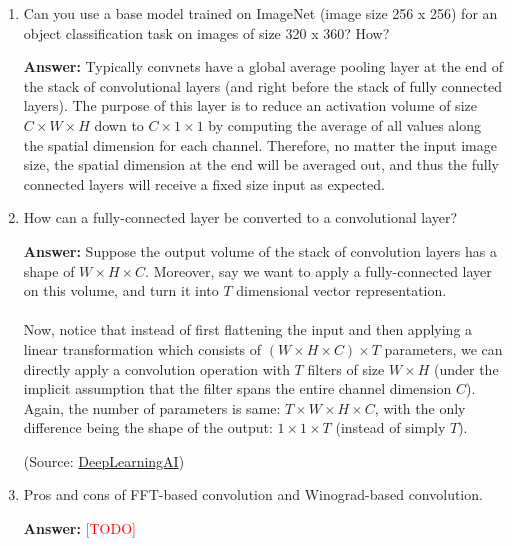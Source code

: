 \documentclass{article}
\newenvironment{QandA}{\begin{enumerate}[label=\arabic*.]}{\end{enumerate}}
\newenvironment{answer}{\par\normalfont \textbf{Answer:}}{}
\newcommand{\todo}{\textcolor{red}{[TODO]}}
\begin{document}
\begin{QandA}
    \item Can you use a base model trained on ImageNet (image size 256 x 256) for an object classification task on images of size 320 x 360? How?
    \begin{answer}
        Typically convnets have a global average pooling layer at the end of the stack of convolutional layers (and right before the stack of fully connected layers). The purpose of this layer is to reduce an activation volume of size $C \times W \times H$ down to $C \times 1 \times 1$ by computing the average of all values along the spatial dimension for each channel. Therefore, no matter the input image size, the spatial dimension at the end will be averaged out, and thus the fully connected layers will receive a fixed size input as expected.
    \end{answer}

    \item How can a fully-connected layer be converted to a convolutional layer?
    \begin{answer}
        Suppose the output volume of the stack of convolution layers has a shape of $W \times H \times C$.  Moreover, say we want to apply a fully-connected layer on this volume, and turn it into $T$ dimensional vector representation.\\\\
        Now, notice that instead of first flattening the input and then applying a linear transformation which consists of $(W \times H \times C) \times T$ parameters, we can directly apply a convolution operation with $T$ filters of size $W \times H$ (under the implicit assumption that the filter spans the entire channel dimension $C$). Again, the number of parameters is same: $T \times W \times H \times C$, with the only difference being the shape of the output: $1 \times 1 \times T$ (instead of simply $T$).

        (Source: \href{https://www.youtube.com/watch?v=XdsmlBGOK-k}{DeepLearningAI})
    \end{answer}

    \item Pros and cons of FFT-based convolution and Winograd-based convolution.
    \begin{answer}
        \todo
    \end{answer}
\end{QandA}
\end{document}
